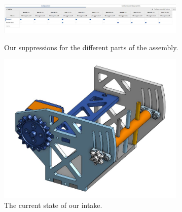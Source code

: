 \begin{figure}[ht]
\centering
\begin{minipage}[b]{.50\textwidth}
  \centering
  \includegraphics[width=0.8\textwidth]{Meetings/August/08-20-21/8-18-21_CAD_Image9 - Nathan Forrer.jpg}
  \caption{Our suppressions for the different parts of the assembly.}
  \label{fig:pic9}
\end{minipage}%
\hfill%
\begin{minipage}[b]{.50\textwidth}
  \centering
  \includegraphics[width=0.8\textwidth]{Meetings/August/08-20-21/8-18-21_CAD_Image10 - Nathan Forrer.jpg}
  \caption{The current state of our intake.}
  \label{fig:pic10}
\end{minipage}
\end{figure}